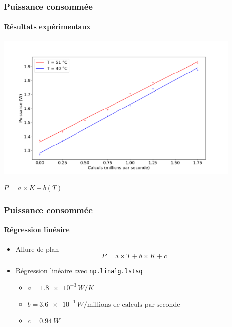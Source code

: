 \documentclass[a4paper,11pt]{beamer}
\newcommand{\p}{\texttt} %
\begin{document}
\begin{frame}
\begin{columns}
\begin{column}{0.5\textwidth}
        \end{column}
    \end{columns}
\end{frame}

\begin{frame}
    \frametitle{Puissance consommée}
    \framesubtitle{Résultats expérimentaux}

    \includegraphics[width=0.9\textwidth]{difference_en_temperature.png}
    \begin{center}
        $P = a\times K + b(T)$
    \end{center}
\end{frame}

\begin{frame}
    \frametitle{Puissance consommée}
    \framesubtitle{Régression linéaire}

    \begin{itemize}
        \item Allure de plan
        $$P = a \times T + b \times K + c$$
        \item Régression linéaire avec \p{np.linalg.lstsq}
        \begin{itemize}
            \item $a = \SI{1.8e-3}{W/K}$
            \item $b = \SI{3.6e-1}{W/\text{millions de calculs par seconde}}$
            \item $c = \SI{0.94}{W}$
        \end{itemize}
    \end{itemize}
\end{frame}
\end{document}
